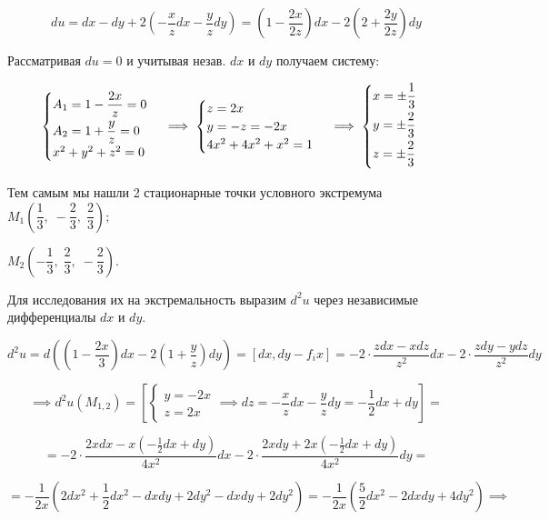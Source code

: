 \documentclass[../../main.tex]{subfiles}
\begin{document}
	
	\[du = dx - dy + 2\left(-\dfrac{x}{z} dx - \dfrac{y}{z}dy\right) = 
	\left(1 - \dfrac{2x}{2z}\right)dx - 2\left(2 + \dfrac{2y}{2z}\right)dy\]
	
	Рассматривая $du = 0$ и учитывая незав. $dx$ и $dy$ получаем систему:
	
	\[\begin{cases}
	\smallskip
	A_1 = 1 - \dfrac{2x}{z} = 0\\
	A_2 = 1 + \dfrac{y}{z} = 0\\
	x^2 + y^2 + z^2 = 0
	\end{cases} \implies \begin{cases}
	z = 2x\\
	y = -z = -2x\\
	4x^2 + 4x^2 + x^2 = 1
	\end{cases} \implies \begin{cases}
	\smallskip
	x = \pm \dfrac{1}{3}\\
	\smallskip
	y = \pm \dfrac{2}{3}\\
	\smallskip
	z = \pm \dfrac{2}{3}\\
	\end{cases}\]
	
	Тем самым мы нашли 2 стационарные точки условного экстремума 
	$M_1\left(\dfrac{1}{3},\; -\dfrac{2}{3},\; \dfrac{2}{3}\right);$
	
	$ M_2\left(-\dfrac{1}{3},\; \dfrac{2}{3}, \; -\dfrac{2}{3}\right)$.
	
	Для исследования их на экстремальность выразим $d^2u$ 
	через независимые дифференциалы $dx$ и $dy$.
	
	\[d^2u = d\left( \left(1 - \dfrac{2x}{3}\right)dx - 
	2\left(1 + \dfrac{y}{z}\right)dy\right) = 
	\left[dx, dy - f_ix\right] = -2 \cdot 
	\dfrac{zdx - xdz}{z^2}dx - 2 \cdot \dfrac{zdy - ydz}{z^2}dy\]
	
	\[\implies d^2u\left(M_{1, 2}\right) = \left[
	\begin{cases}
	y = -2x\\
	z = 2x 
	\end{cases} \implies dz = -\dfrac{x}{z}dx - \dfrac{y}{z}dy = 
	-\dfrac{1}{2}dx + dy 
	\right] =\]
	
	\[ = -2 \cdot \frac{2xdx - x\left(-\frac{1}{2}dx + dy\right)}{4x^2}dx - 
	2 \cdot \frac{2xdy + 2x \left(-\frac{1}{2}dx + dy\right)}{4x^2}dy = \]
	
	\[= -\dfrac{1}{2x}\left(2dx^2 + \dfrac{1}{2}dx^2 - dxdy + 2dy^2 - 
	dxdy + 2dy^2 \right) = -\dfrac{1}{2x} \left( \dfrac{5}
	{2} dx^2 - 2dxdy + 4dy^2 \right) \implies \]
	
\end{document}
